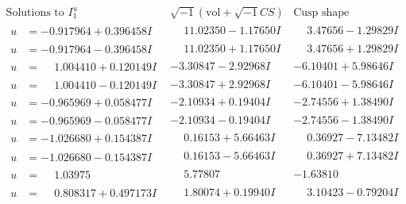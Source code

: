 \documentclass[1p]{elsarticle_modified}
\theoremstyle{definition}
\newcommand{\I}{\sqrt{-1}}
\begin{document}
$$\begin{array}{c|c|c}  
\text{Solutions to }I^u_{1}& \I (\text{vol} + \sqrt{-1}CS) & \text{Cusp shape}\\
 \hline 
\begin{aligned}
u &= -0.917964 + 0.396458 I\end{aligned}
 & \phantom{-}11.02350 - 1.17650 I & \phantom{-}3.47656 - 1.29829 I \\ \hline\begin{aligned}
u &= -0.917964 - 0.396458 I\end{aligned}
 & \phantom{-}11.02350 + 1.17650 I & \phantom{-}3.47656 + 1.29829 I \\ \hline\begin{aligned}
u &= \phantom{-}1.004410 + 0.120149 I\end{aligned}
 & -3.30847 - 2.92968 I & -6.10401 + 5.98646 I \\ \hline\begin{aligned}
u &= \phantom{-}1.004410 - 0.120149 I\end{aligned}
 & -3.30847 + 2.92968 I & -6.10401 - 5.98646 I \\ \hline\begin{aligned}
u &= -0.965969 + 0.058477 I\end{aligned}
 & -2.10934 + 0.19404 I & -2.74556 + 1.38490 I \\ \hline\begin{aligned}
u &= -0.965969 - 0.058477 I\end{aligned}
 & -2.10934 - 0.19404 I & -2.74556 - 1.38490 I \\ \hline\begin{aligned}
u &= -1.026680 + 0.154387 I\end{aligned}
 & \phantom{-}0.16153 + 5.66463 I & \phantom{-}0.36927 - 7.13482 I \\ \hline\begin{aligned}
u &= -1.026680 - 0.154387 I\end{aligned}
 & \phantom{-}0.16153 - 5.66463 I & \phantom{-}0.36927 + 7.13482 I \\ \hline\begin{aligned}
u &= \phantom{-}1.03975\phantom{ +0.000000I}\end{aligned}
 & \phantom{-}5.77807\phantom{ +0.000000I} & -1.63810\phantom{ +0.000000I} \\ \hline\begin{aligned}
u &= \phantom{-}0.808317 + 0.497173 I\end{aligned}
 & \phantom{-}1.80074 + 0.19940 I & \phantom{-}3.10423 - 0.79204 I \\ \hline\begin{aligned}

\end{aligned}
\end{array}$$
\end{document}
